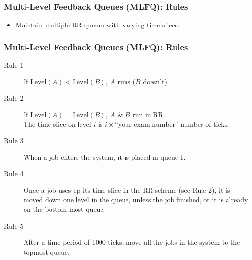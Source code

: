 \begin{frame}

\frametitle{Multi-Level Feedback Queues (MLFQ): Rules}

\begin{itemize}

\item Maintain multiple RR queues with varying time slices.


\end{itemize}

\end{frame}

\begin{frame}

\frametitle{Multi-Level Feedback Queues (MLFQ): Rules}

\begin{description}

\item [Rule 1] If $\text{Level}(A) < \text{Level}(B)$, $A$ runs ($B$ doesn't).

\item [Rule 2] If $\text{Level}(A) = \text{Level}(B)$, $A$ \& $B$ run in RR. \\
The time-slice on level $i$ is $i\times\text{``your exam number''}$ number of
ticks.

\item [Rule 3] When a job enters the system, it is placed in queue 1.

\item [Rule 4] Once a job uses up its time-slice in the RR-scheme (see Rule 2),
it is moved down one level in the queue, unless the job finished, or it is
already on the bottom-most queue.

\item [Rule 5] After a time period of 1000 ticks, move all the jobs in the
system to the topmost queue.

\end{description}

\end{frame}
